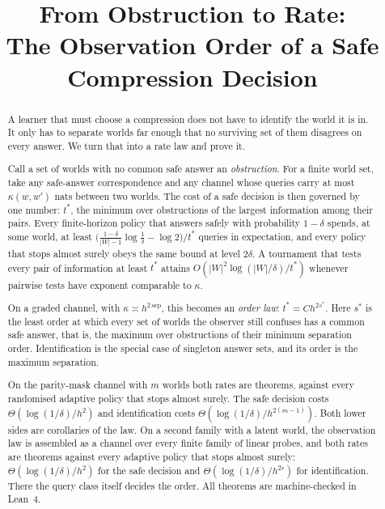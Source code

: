 



\title{From Obstruction to Rate:\\The Observation Order of a Safe Compression Decision}

\author{
}

\maketitle

\begin{abstract}
A learner that must choose a compression does not have to identify the world it is in. It
only has to separate worlds far enough that no surviving set of them disagrees on every
answer. We turn that into a rate law and prove it.

Call a set of worlds with no common safe answer an \emph{obstruction}. For a finite world
set, take any safe-answer correspondence and any channel whose queries carry at most
$\kappa(w,w')$ nats between two worlds. The cost of a safe decision is then governed by one
number: $t^{*}$, the minimum over obstructions of the largest information among their pairs.
Every finite-horizon policy that answers safely with probability $1-\delta$ spends, at some
world, at least $\bigl(\frac{1-\delta}{|W|-1}\log\frac1\delta-\log2\bigr)/t^{*}$ queries in
expectation, and every policy that stops almost surely obeys the same bound at level
$2\delta$. A tournament that tests every pair of information at least $t^{*}$ attains
$O(|W|^{2}\log(|W|/\delta)/t^{*})$ whenever pairwise tests have exponent comparable to
$\kappa$.

On a graded channel, with $\kappa\asymp h^{2\,\mathrm{sep}}$, this becomes an \emph{order law}:
$t^{*}=Ch^{2s^{*}}$. Here $s^{*}$ is the least order at which every set of worlds the observer
still confuses has a common safe answer, that is, the maximum over obstructions of their
minimum separation order. Identification is the special case of singleton answer sets, and its
order is the maximum separation.

On the parity-mask channel with $m$ worlds both rates are theorems, against every randomised
adaptive policy that stops almost surely. The safe decision costs
$\Theta(\log(1/\delta)/h^{2})$ and identification costs $\Theta(\log(1/\delta)/h^{2(m-1)})$. Both
lower sides are corollaries of the law. On a second family with a latent world, the observation
law is assembled as a channel over every finite family of linear probes, and both rates are
theorems against every adaptive policy that stops almost surely: $\Theta(\log(1/\delta)/h^{2})$
for the safe decision and $\Theta(\log(1/\delta)/h^{2r})$ for identification. There the query class
itself decides the order. All theorems are machine-checked in Lean~4.
\end{abstract}

